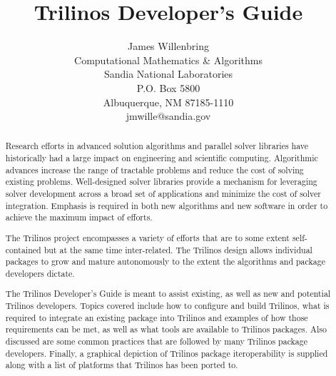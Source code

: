 \documentclass[12pt,relax]{SANDreport}
\title{Trilinos Developer's Guide}
\author{James Willenbring\\
       Computational Mathematics \& Algorithms \\
	  Sandia National Laboratories\\
	  P.O. Box 5800\\
	  Albuquerque, NM 87185-1110 \\
	  jmwille@sandia.gov \\
	 }
\date{}
\begin{document}
    \maketitle

    \begin{abstract}

Research efforts in advanced solution algorithms and parallel solver
libraries have historically had a large impact on engineering and
scientific computing.  Algorithmic advances increase the range
of tractable problems and reduce the cost of solving existing
problems.  Well-designed solver libraries provide a mechanism for
leveraging solver development across a broad set of applications and
minimize the cost of solver integration.  Emphasis is
required in both new algorithms and new software in order
to achieve the maximum impact of efforts.

The Trilinos project encompasses a variety of efforts that are to some
extent self-contained but at the same time inter-related.  The
Trilinos design allows individual packages to grow and mature
autonomously to the extent the algorithms and package developers
dictate. 

The Trilinos Developer's Guide is meant to assist existing, as well as new and
potential Trilinos developers.  Topics covered include how to configure and 
build Trilinos, what is required to integrate an existing package into Trilinos
and examples of how those requirements can be met, as well as what tools are 
available to Trilinos packages.  Also discussed are some common practices that 
are followed by many Trilinos package developers.  Finally, a graphical 
depiction of Trilinos package iteroperability is supplied along with a list of 
platforms that Trilinos has been ported to.

\end{abstract}

%
%

\end{document}
